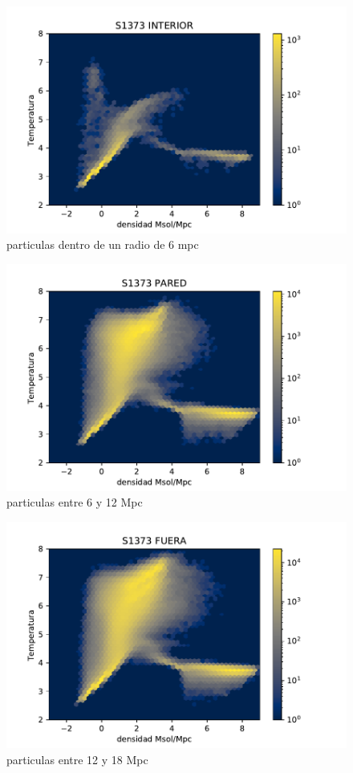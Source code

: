 \begin{figure}[h]
\centering
\includegraphics[width=18cm]{Figures/S1373_diagfase_int.pdf}
\decoRule
\caption[Diagrama de Fase S internas]{particulas dentro de un radio de 6 mpc}
\label{fig:Electron}
\end{figure}
\begin{figure}[h]
\centering
\includegraphics[width=18cm]{Figures/S1373_diagfase_wll.pdf}
\decoRule
\caption[Diagrama de Fase S pared]{particulas entre 6 y 12 Mpc}
\label{fig:Electron}
\end{figure}
\begin{figure}[h]
\centering
\includegraphics[width=18cm]{Figures/S1373_diagfase_ext.pdf}
\decoRule
\caption[Diagrama de Fase S externas]{particulas entre 12 y 18 Mpc}
\label{fig:Electron}
\end{figure}
